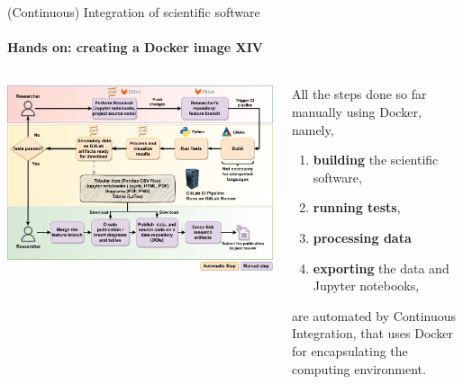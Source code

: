 \begin{frame}{(Continuous) Integration of scientific software} 
    \framesubtitle{Hands on: creating a Docker image XIV} 
    \vfill

    \begin{columns}
        \begin{column}[c]{0.55\textwidth}
            \includegraphics[width=\columnwidth]{figures/ZINF-CI-diagram-individual.pdf}
        \end{column}
        \begin{column}[c]{0.40\textwidth}
            All the steps done so far manually using Docker, namely,

            \begin{enumerate}
                \item \textbf{building} the scientific software, 
                \item \textbf{running tests}, 
                \item \textbf{processing data} 
                \item \textbf{exporting} the data and Jupyter notebooks, 
            \end{enumerate}

            are automated by Continuous Integration, that uses Docker for encapsulating the computing environment. 
        \end{column}
    \end{columns}

\end{frame}


